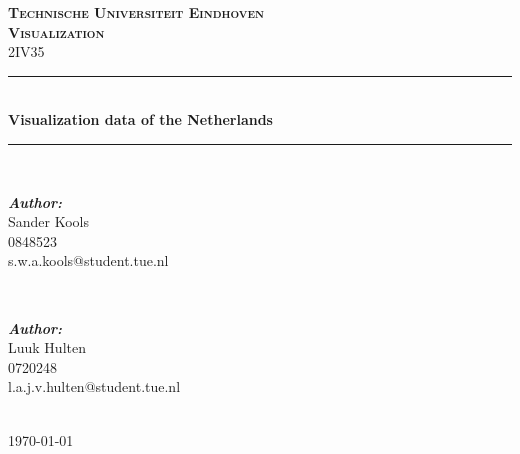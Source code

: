 \documentclass[a4paper,twoside,11pt]{article}
\newcommand{\HRule}{\rule{\linewidth}{0.5mm}} %
\begin{document}
\begin{titlepage}

\center %

\textsc{\Huge \textbf{Technische Universiteit Eindhoven}}\\[1.5cm] %
\textsc{\LARGE \textbf{Visualization}}\\[0.5cm] %
\textsc{\large 2IV35}\\[0.5cm] %

\HRule \\[0.4cm]
{ \huge \bfseries Visualization data of the Netherlands}\\[0.4cm] %
\HRule \\[1.5cm]

\begin{minipage}{0.4\textwidth}
\begin{flushleft} \large
\emph{\textbf{Author:}}\\
Sander Kools \\
0848523 \\
s.w.a.kools@student.tue.nl %
\end{flushleft}
\end{minipage}
~
\begin{minipage}{0.4\textwidth}
\begin{flushright} \large
\emph{\textbf{Author:}}\\
Luuk Hulten\\
0720248 \\
l.a.j.v.hulten@student.tue.nl
\end{flushright}
\end{minipage}\\[4cm]

{\large \today}\\[3cm] %

\vfill %

\end{titlepage}

\newpage
\tableofcontents
\newpage
\end{document}
